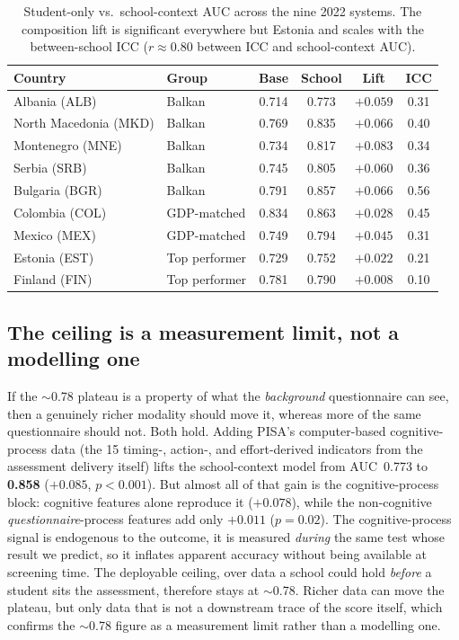 \begin{table}[t]
\centering
\caption[Student-only vs.\ school-context AUC across nine systems]{Student-only vs.\ school-context AUC across the nine 2022 systems. The
composition lift is significant everywhere but Estonia and scales with the
between-school ICC ($r\approx0.80$ between ICC and school-context AUC).}
\label{tab:generalization}
\begin{tabular}{llcccc}
\toprule
Country & Group & Base & School & Lift & ICC \\
\midrule
Albania (ALB)        & Balkan        & 0.714 & 0.773 & $+0.059$ & 0.31 \\
North Macedonia (MKD)& Balkan        & 0.769 & 0.835 & $+0.066$ & 0.40 \\
Montenegro (MNE)     & Balkan        & 0.734 & 0.817 & $+0.083$ & 0.34 \\
Serbia (SRB)         & Balkan        & 0.745 & 0.805 & $+0.060$ & 0.36 \\
Bulgaria (BGR)       & Balkan        & 0.791 & 0.857 & $+0.066$ & 0.56 \\
Colombia (COL)       & GDP-matched   & 0.834 & 0.863 & $+0.028$ & 0.45 \\
Mexico (MEX)         & GDP-matched   & 0.749 & 0.794 & $+0.045$ & 0.31 \\
Estonia (EST)        & Top performer & 0.729 & 0.752 & $+0.022$ & 0.21 \\
Finland (FIN)        & Top performer & 0.781 & 0.790 & $+0.008$ & 0.10 \\
\bottomrule
\end{tabular}
\end{table}

\subsection{The ceiling is a measurement limit, not a modelling one}
If the $\sim$0.78 plateau is a property of what the \emph{background} questionnaire can
see, then a genuinely richer modality should move it, whereas more of the same
questionnaire should not. Both hold. Adding PISA's computer-based cognitive-process
data (the 15 timing-, action-, and effort-derived indicators from the assessment
delivery itself) lifts the school-context model from AUC~0.773 to
\textbf{0.858} ($+0.085$, $p<0.001$). But almost all of that gain is the
cognitive-process block: cognitive features alone reproduce it ($+0.078$), while the
non-cognitive \emph{questionnaire}-process features add only $+0.011$ ($p=0.02$). The
cognitive-process signal is endogenous to the outcome, it is measured \emph{during} the
same test whose result we predict, so it inflates apparent accuracy without being
available at screening time. The deployable ceiling, over data a school could hold
\emph{before} a student sits the assessment, therefore stays at $\sim$0.78. Richer data
can move the plateau, but only data that is not a downstream trace of the score itself,
which confirms the $\sim$0.78 figure as a measurement limit rather than a modelling one.

